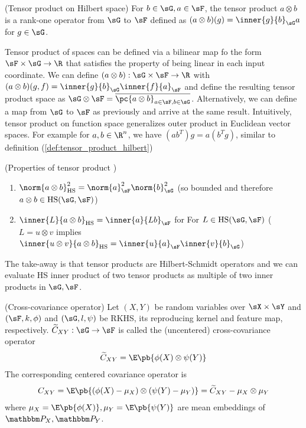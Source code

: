 \documentclass[11pt]{article}
\begin{document}
\begin{definition}
    \label{def:tensor_product_hilbert}
    (Tensor product on Hilbert space) For $b\in\sG,a\in \sF$, the tensor product $a\otimes b$ is a rank-one operator from $\sG$ to $\sF$ defined as $(a\otimes b)(g) = \inner{g}{b}_{\sG} a$ for $g\in\sG$.
\end{definition}

Tensor product of spaces can be defined via a bilinear map fo the form $\sF\times\sG\to\R$ that satisfies the property of being linear in each input coordinate. We can define $(a\otimes b): \sG\times\sF\to\R$ with $(a\otimes b)(g,f) =\inner{g}{b}_{\sG}\inner{f}{a}_{\sF}$ and define the resulting tensor product space as $\sG\otimes \sF = \overline{\pc{a\otimes b}_{a\in\sF,b\in\sG}}$. Alternatively, we can define a map from $\sG$ to $\sF$ as previously and arrive at the same result. Intuitively, tensor product on function space generalizes outer product in Euclidean vector spaces. For example for $a,b\in\R^n$, we have $(ab^T)g = a(b^Tg)$, similar to definition (\ref{def:tensor_product_hilbert})

\begin{proposition}
    (Properties of tensor product \cite{grettonNotesMeanEmbeddings2019}) 
    \begin{enumerate}
        \item $\norm{a\otimes b}_{\text{HS}}^2 = \norm{a}_{\sF}^2 \norm{b}_{\sG}^2$ (so bounded and therefore $a\otimes b \in \text{HS}(\sG,\sF)$)
        \item $\inner{L}{a\otimes b}_{\text{HS}} = \inner{a}{Lb}_{\sF}$ for For $L\in\text{HS}(\sG,\sF)$ ($L=u\otimes v$ implies $\inner{u\otimes v}{a\otimes b}_{\text{HS}} = \inner{u}{a}_{\sF} \inner{v}{b}_{\sG}$)
    \end{enumerate}
\end{proposition}

The take-away is that tensor products are Hilbert-Schmidt operators and we can evaluate HS inner product of two tensor products as multiple of two inner products in $\sG,\sF$.

\begin{definition}
    (Cross-covariance operator) Let $(X,Y)$ be random variables over $\sX\times\sY$ and $(\sF,k,\phi)$ and $(\sG,l,\psi)$ be RKHS, its reproducing kernel and feature map, respectively. $\widetilde{C}_{XY}:\sG\to\sF$ is called the (uncentered) cross-covariance operator
    \begin{align}
        \widetilde{C}_{XY}
            = \E\pb{ \phi(X) \otimes \psi(Y) }
    \end{align}
    The corresponding centered covariance operator is 
    \begin{align}
        C_{XY} 
            = \E\pb{ (\phi(X)-\mu_X)\otimes (\psi(Y)-\mu_Y) }
            = \widetilde{C}_{XY} - \mu_{X} \otimes \mu_{Y}
    \end{align}
    where $\mu_X = \E\pb{\phi(X)}, \mu_Y = \E\pb{\psi(Y)}$ are mean embeddings of $\bbP_X,\bbP_Y$.
\end{definition}
\end{document}
